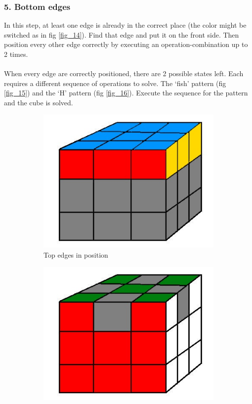 \documentclass[a4paper,11pt]{kth-mag}
\begin{document}
\subsubsection{5. Bottom edges}
In this step, at least one edge is already in the correct place (the color might be switched as in fig \ref{fig_14}). Find that edge and put it on the front side. Then position every other edge correctly by executing an operation-combination up to 2 times.\\\\
When every edge are correctly positioned, there are 2 possible states left. Each requires a different sequence of operations to solve. The ‘fish’ pattern (fig \ref{fig_15}) and the ‘H’ pattern (fig \ref{fig_16}). Execute the sequence for the pattern and the cube is solved.
\begin{figure}[bh]
	\centering
	\begin{subfigure}[!b]{0.3\textwidth}
		\includegraphics[width=\textwidth]{figs/rubiks-top-edges.jpg}
		\caption{Top edges in position}
		\label{fig_12}
	\end{subfigure}
	\begin{subfigure}[!b]{0.3\textwidth}
		\includegraphics[width=\textwidth]{figs/rubiks-bottom-edges.jpg}

\end{subfigure}
\end{figure}
\end{document}
